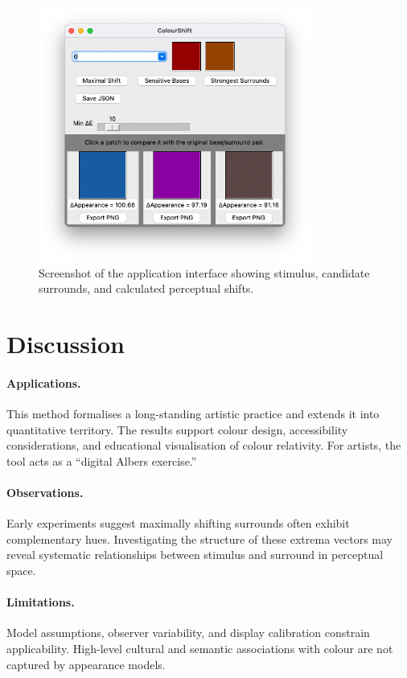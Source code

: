 \documentclass[11pt]{article}
\begin{document}
\begin{figure}[h!]
\centering
\includegraphics[width=0.8\textwidth]{screenshot.png}
\caption{Screenshot of the application interface showing stimulus, candidate surrounds, and calculated perceptual shifts.}
\end{figure}

\section{Discussion}
\paragraph{Applications.} This method formalises a long-standing artistic practice and extends it into quantitative territory. The results support colour design, accessibility considerations, and educational visualisation of colour relativity. For artists, the tool acts as a ``digital Albers exercise.''

\paragraph{Observations.} Early experiments suggest maximally shifting surrounds often exhibit complementary hues. Investigating the structure of these extrema vectors may reveal systematic relationships between stimulus and surround in perceptual space.

\paragraph{Limitations.} Model assumptions, observer variability, and display calibration constrain applicability. High-level cultural and semantic associations with colour are not captured by appearance models.
\end{document}
